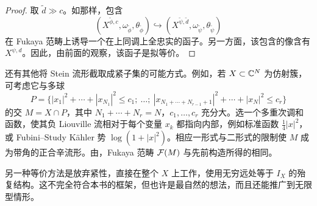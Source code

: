 \begin{proof}
取 $\widetilde d\gg c$。如那样，包含
\[
(X^{\widetilde\phi,c},\omega_{\widetilde\phi},\theta_{\widetilde\phi})
\hookrightarrow(X^{\widetilde\psi,\widetilde d},\omega_{\widetilde\psi},\theta_{\widetilde\psi})
\]
在 Fukaya 范畴上诱导一个在上同调上全忠实的函子。另一方面，该包含的像含有 $X^{\psi,d}$。因此，由前面的观察，该函子是拟等价。
\end{proof}

\begin{note}\label{st:19.5}
还有其他将 Stein 流形截取成紧子集的可能方式。例如，若 $X\subset\mathbb C^N$ 为仿射簇，可考虑它与多球
\[
P=\bigl\{|x_1|^2+\cdots+|x_{N_1}|^2\le c_1;\ \ldots;\
|x_{N_1+\cdots+N_{r-1}+1}|^2+\cdots+|x_N|^2\le c_r\bigr\}
\]
的交 $M=X\cap P$，其中 $N_1+\cdots+N_r=N$，$c_1,\ldots,c_r$ 充分大。选一个多重次调和函数，使其负 Liouville 流相对于每个变量 $x_k$ 都指向内部，例如标准函数 $\tfrac14|x|^2$，或 Fubini--Study Kähler 势 $\log(1+|x|^2)$。相应一形式与二形式的限制使 $M$ 成为带角的正合辛流形。由，Fukaya 范畴 $\mathcal F(M)$ 与先前构造所得的相同。

另一种等价方法是放弃紧性，直接在整个 $X$ 上工作，使用无穷远处等于 $I_X$ 的殆复结构。这不完全符合本书的框架，但也许是最自然的想法，而且还能推广到无限型情形。
\end{note}
